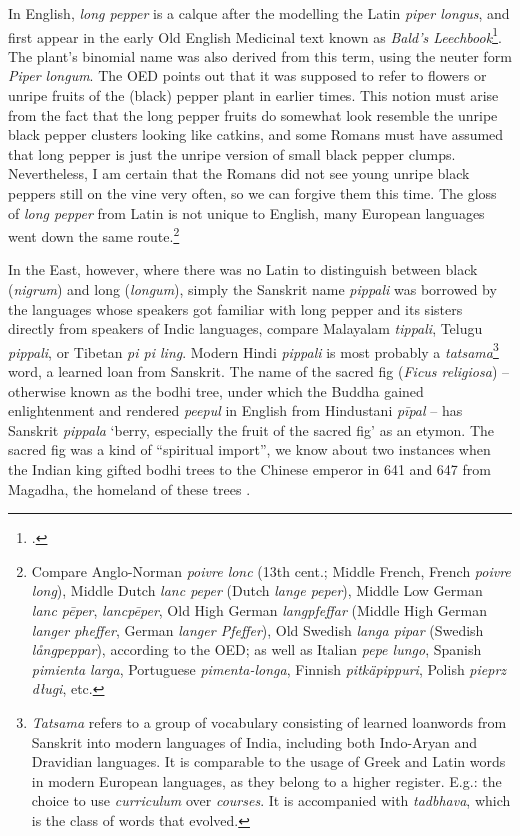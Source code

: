 



In English, \textit{long pepper} is a calque after the modelling the Latin \textit{piper longus}, and first appear in the early Old English Medicinal text known as \textit{Bald's Leechbook}\footcite[longpepper]{oed}. The plant's binomial name was also derived from this term, using the neuter form \textit{Piper longum}. The \gls{OED} points out that it was supposed to refer to flowers or unripe fruits of the (black) pepper plant in earlier times. This notion must arise from the fact that the long pepper fruits do somewhat look resemble the unripe black pepper clusters looking like catkins, and some Romans must have assumed that long pepper is just the unripe version of small black pepper clumps. Nevertheless, I am certain that the Romans did not see young unripe black peppers still on the vine very often, so we can forgive them this time. The gloss of \textit{long pepper} from Latin is not unique to English, many European languages went down the same route.\footnote{Compare Anglo-Norman \textit{poivre lonc} (13th cent.; Middle French, French \textit{poivre long}), Middle Dutch \textit{lanc peper} (Dutch \textit{lange peper}), Middle Low German \textit{lanc pēper}, \textit{lancpēper}, Old High German \textit{langpfeffar} (Middle High German \textit{langer pheffer}, German \textit{langer Pfeffer}), Old Swedish \textit{langa pipar} (Swedish \textit{långpeppar}), according to the OED; as well as Italian \textit{pepe lungo}, Spanish \textit{pimienta larga}, Portuguese \textit{pimenta-longa}, Finnish \textit{pitkäpippuri}, Polish \textit{pieprz długi}, etc.} 

In the East, however, where there was no Latin to distinguish between black (\textit{nigrum}) and long (\textit{longum}), simply the Sanskrit name \textit{pippali} was borrowed by the languages whose speakers got familiar with long pepper and its sisters directly from speakers of Indic languages, compare Malayalam \textit{tippali}, Telugu \textit{pippali}, or Tibetan \textit{pi pi ling}. Modern Hindi \textit{pippali} is most probably a \textit{tatsama}\footnote{\textit{Tatsama} refers to a group of vocabulary consisting of learned loanwords from Sanskrit into modern languages of India, including both Indo-Aryan and Dravidian languages. It is comparable to the usage of Greek and Latin words in modern European languages, as they belong to a higher register. E.g.: the choice to use \textit{curriculum} over \textit{courses}. It is accompanied with  \textit{tadbhava}, which is the class of words that evolved.} word, a learned loan from Sanskrit. The name of the sacred fig (\textit{Ficus religiosa}) -- otherwise known as the bodhi tree, under which the Buddha gained enlightenment and rendered \textit{peepul} in English from Hindustani \textit{p\={i}pal} -- has Sanskrit \textit{pippala} `berry, especially the fruit of the sacred fig' as an etymon. The sacred fig was a kind of ``spiritual import'', we know about two instances when the Indian king gifted bodhi trees to the Chinese emperor in 641 and 647 from Magadha, the homeland of these trees \autocite[122]{schafer_golden_1985}.

